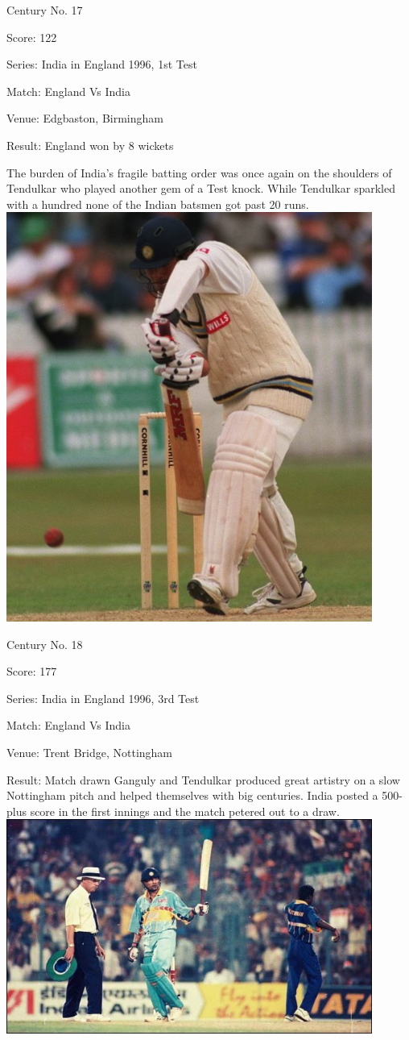 \documentclass[11pt, a4paper]{article}
\begin{document}
Century No. 17 

Score: 122 

Series: India in England 1996, 1st Test 

Match: England Vs India 

Venue: Edgbaston, Birmingham 

Result: England won by 8 wickets 

The burden of India's fragile batting order was once again on the shoulders of Tendulkar who played another gem of a Test knock. While Tendulkar sparkled with a hundred none of the Indian batsmen got past 20 runs.
\newpage
\includegraphics[width=0.9\textwidth]{pics/18.jpg}

Century No. 18 

Score: 177 

Series: India in England 1996, 3rd Test 

Match: England Vs India 

Venue: Trent Bridge, Nottingham 

Result: Match drawn Ganguly and Tendulkar produced great artistry on a slow Nottingham pitch and helped themselves with big centuries. India posted a 500-plus score in the first innings and the match petered out to a draw.
\newpage
\includegraphics[width=0.9\textwidth]{pics/19.jpg}
\end{document}
